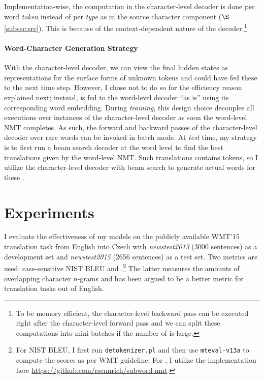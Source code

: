 Implementation-wise, the computation in the
character-level decoder is done per word {\it token} instead of per {\it type} as in the source
character component ($\S$\ref{subsec:src}). 
This is because of the context-dependent nature of the decoder.\footnote{To be memory efficient, the character-level backward pass can be executed right
after the character-level forward pass
and we can split these computations into
mini-batches if the number of \unk{} is large.}

\paragraph{Word-Character Generation Strategy}
\label{subsubsec:strategy}
With the character-level decoder, we can view the final hidden states as representations for
the surface forms of unknown tokens and could have fed these to the next
time step. However, I chose not to do so for the efficiency reason explained
next; instead, \unk{} is fed to the word-level decoder
``as is'' using its corresponding word embedding.
During {\it training}, this design choice decouples all executions over \unk{} instances of the
character-level decoder as soon the word-level NMT
completes. As such, the forward and backward passes of the character-level
decoder over rare words can be invoked in batch mode. At {\it test} time,
my strategy is to first run a beam search decoder at the word level to
find the best translations given by the
word-level NMT. Such translations contains \unk{} tokens, so I utilize the 
character-level decoder with beam search to generate actual words for these \unk{}.

\section{Experiments}
\label{sec:exp}
I evaluate the effectiveness of my models on the publicly available WMT'15
translation task from English into Czech with 
{\it newstest2013} (3000 sentences) as
a development set %
and {\it newstest2015} (2656 sentences) as a test set. Two metrics are used: case-sensitive NIST BLEU \cite{Papineni02bleu}
and \chr{} \cite{chrf}.\footnote{For NIST BLEU, I first run
\texttt{detokenizer.pl} %
and then use \texttt{mteval-v13a}
to compute the scores as per WMT guideline. For \chr{}, I utilize the implementation here
\url{https://github.com/rsennrich/subword-nmt}.}
The latter measures the amounts of overlapping character $n$-grams and has
been argued to be a better metric for translation tasks out of English.


